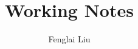 \documentclass[a4paper,12pt,oneside]{book}
\author{Fenglai Liu}
\title{Working Notes}
\theoremstyle{definition}\newtheorem{law}{Law}
\theoremstyle{plain}\newtheorem{theorem}{Theorem}
\theoremstyle{remark}\newtheorem{remark}{Remark}
\theoremstyle{axiom}\newtheorem{axiom}{Axiom}
\numberwithin{law}{chapter}
\numberwithin{theorem}{chapter}
\numberwithin{remark}{chapter}
\begin{document}
\maketitle
\tableofcontents


\graphicspath{{figure/}}




%
%
%
%
%
%
%
%
%
%
%
%
%
%
%

%
%
%

%
%
%
%
%
%

%
%


%
%
%
\end{document}
